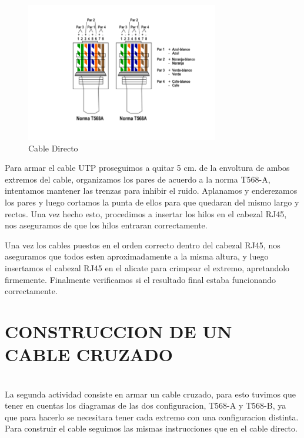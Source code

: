 \documentclass[onecolumn,12pt]{IEEEtran}
\begin{document}
\begin{figure}[h]
\caption{Cable Directo}
\centering \includegraphics[width=0.75\textwidth]{Directo.png}
\end{figure}




Para armar el cable UTP proseguimos a quitar 5 cm. de la envoltura de ambos extremos del cable, organizamos los pares de acuerdo a la norma T568-A, intentamos mantener las trenzas para inhibir el ruido. Aplanamos y enderezamos los pares y luego cortamos la punta de ellos para que quedaran del mismo largo y rectos. Una vez hecho esto, procedimos a insertar los hilos en el cabezal RJ45, nos aseguramos de que los hilos entraran correctamente.
\\ \hfill

Una vez los cables puestos en el orden correcto dentro del cabezal RJ45, nos aseguramos que todos esten aproximadamente a la misma altura, y luego insertamos el cabezal RJ45 en el alicate para crimpear el extremo, apretandolo firmemente. Finalmente verificamos si el resultado final estaba funcionando correctamente.



\newpage

\section{CONSTRUCCION DE UN CABLE CRUZADO}
\hfill \\

La segunda actividad consiste en armar un cable cruzado, para esto tuvimos que tener en cuentas los diagramas de las dos configuracion, T568-A y T568-B, ya que para hacerlo se necesitara tener cada extremo con una configuracion distinta.
Para construir el cable seguimos las mismas instrucciones que en el cable directo.
\end{document}
